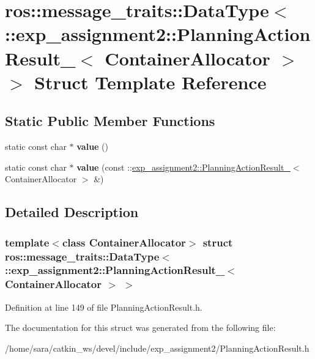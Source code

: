 \hypertarget{structros_1_1message__traits_1_1DataType_3_01_1_1exp__assignment2_1_1PlanningActionResult___3_01ContainerAllocator_01_4_01_4}{}\section{ros\+:\+:message\+\_\+traits\+:\+:Data\+Type$<$ \+:\+:exp\+\_\+assignment2\+:\+:Planning\+Action\+Result\+\_\+$<$ Container\+Allocator $>$ $>$ Struct Template Reference}
\label{structros_1_1message__traits_1_1DataType_3_01_1_1exp__assignment2_1_1PlanningActionResult___3_01ContainerAllocator_01_4_01_4}
\subsection*{Static Public Member Functions}
\begin{DoxyCompactItemize}
\item 
\mbox{\label{structros_1_1message__traits_1_1DataType_3_01_1_1exp__assignment2_1_1PlanningActionResult___3_01ContainerAllocator_01_4_01_4_acf2a1f3bd564845f3e2541d2f3da8df8}} 
static const char $\ast$ {\bfseries value} ()
\item 
\mbox{\label{structros_1_1message__traits_1_1DataType_3_01_1_1exp__assignment2_1_1PlanningActionResult___3_01ContainerAllocator_01_4_01_4_ae173eb25a002fe1ac809f7a0290eafae}} 
static const char $\ast$ {\bfseries value} (const \+::\hyperlink{structexp__assignment2_1_1PlanningActionResult__}{exp\+\_\+assignment2\+::\+Planning\+Action\+Result\+\_\+}$<$ Container\+Allocator $>$ \&)
\end{DoxyCompactItemize}


\subsection{Detailed Description}
\subsubsection*{template$<$class Container\+Allocator$>$\newline
struct ros\+::message\+\_\+traits\+::\+Data\+Type$<$ \+::exp\+\_\+assignment2\+::\+Planning\+Action\+Result\+\_\+$<$ Container\+Allocator $>$ $>$}



Definition at line 149 of file Planning\+Action\+Result.\+h.



The documentation for this struct was generated from the following file\+:\begin{DoxyCompactItemize}
\item 
/home/sara/catkin\+\_\+ws/devel/include/exp\+\_\+assignment2/Planning\+Action\+Result.\+h\end{DoxyCompactItemize}
